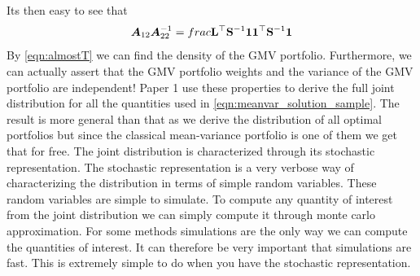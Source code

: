 \documentclass[oneside]{book}\usepackage{knitr}
\begin{document}
Its then easy to see that
$$
\mbox{\boldmath$A$}_{12}\mbox{\boldmath$A$}^{-1}_{22}= frac{\mathbf{L}^\top \mathbf{S}^{-1} \mathbf{1}}{\mathbf{1}^\top \mathbf{S}^{-1} \mathbf{1}}
$$
By \eqref{eqn:almostT} we can find the density of the GMV portfolio. 
Furthermore, we can actually assert that the GMV portfolio weights and the variance of the GMV portfolio are independent!
Paper 1 use these properties to derive the full joint distribution for all the quantities used in \eqref{eqn:meanvar_solution_sample}.
The result is more general than that as we derive the distribution of all optimal portfolios but since the classical mean-variance portfolio is one of them we get that for free. 
The joint distribution is characterized through its stochastic representation.
The stochastic representation is a very verbose way of characterizing the distribution in terms of simple random variables.
These random variables are simple to simulate.
To compute any quantity of interest from the joint distribution we can simply compute it through monte carlo approximation. 
For some methods simulations are the only way we can compute the quantities of interest.
It can therefore be very important that simulations are fast.
This is extremely simple to do when you have the stochastic representation.
\end{document}

